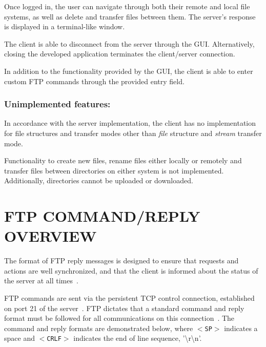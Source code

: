 \documentclass[10pt,twocolumn]{witseiepaper}
\begin{document}

Once logged in, the user can navigate through both their remote and local file systems, as well as delete and transfer files between them. The server's response is displayed in a terminal-like window. 

The client is able to disconnect from the server through the GUI. Alternatively, closing the developed application terminates the client/server connection.

In addition to the functionality provided by the GUI, the client is able to enter custom FTP commands through the provided entry field. 


\vspace*{-\baselineskip}
\subsubsection*{Unimplemented features: } 
In accordance with the server implementation, the client has no implementation for file structures and transfer modes other than \textit{file} structure and \textit{stream} transfer mode.

Functionality to create new files, rename files either locally or remotely and transfer files between directories on either system is not implemented. Additionally, directories cannot be uploaded or downloaded.


\section{FTP COMMAND/REPLY OVERVIEW}\label{sec:command/reply}

The format of FTP reply messages is designed to ensure that requests and actions are well synchronized, and that the client is informed about the status of the server at all times~\cite{rfc959}. 

FTP commands are sent via the persistent TCP control connection, established on port 21 of the server~\cite{topDownApproach6th}. FTP dictates that a standard command and reply format must be followed for all communications on this connection~\cite{rfc959}. The command and reply formats are demonstrated below, where \texttt{$<$SP$>$} indicates a space and \texttt{$<$CRLF$>$} indicates the end of line sequence, '\textbackslash r\textbackslash n'.
\end{document}
